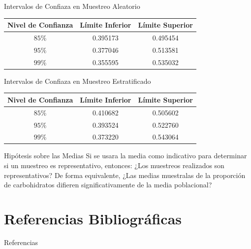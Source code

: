\documentclass{beamer}
\begin{document}
    \begin{frame}{Intervalos de Confiaza en Muestreo Aleatorio}
        \begin{center}
            \begin{tabular}{|c|c|c|}
                \hline
                Nivel de Confianza & Límite Inferior & Límite Superior \\
                \hline
                $85\%$ & 0.395173 & 0.495454 \\
                $95\%$ & 0.377046 & 0.513581 \\
                $99\%$ & 0.355595 & 0.535032 \\
                \hline
            \end{tabular}
        \end{center}      
    \end{frame}

    \begin{frame}{Intervalos de Confiaza en Muestreo Estratificado}
        \begin{center}
            \begin{tabular}{|c|c|c|}
                \hline
                Nivel de Confianza & Límite Inferior & Límite Superior \\
                \hline
                $85\%$ & 0.410682 & 0.505602 \\
                $95\%$ & 0.393524 & 0.522760 \\
                $99\%$ & 0.373220 & 0.543064 \\
                \hline
                \end{tabular}
        \end{center}
    \end{frame}

    \begin{frame}{Hipótesis sobre las Medias}
            Si se usara la media como indicativo para determinar 
            si un muestreo es representativo, entonces: ¿Los muestreos 
            realizados son representativos? De forma equivalente, ¿Las 
            medias muestralas de la proporción de carbohidratos difieren 
            significativamente de la media poblacional?
    \end{frame}

    \section{Referencias Bibliográficas}

    \begin{frame}{Referencias}
        \printbibliography
    \end{frame}
\end{document}
